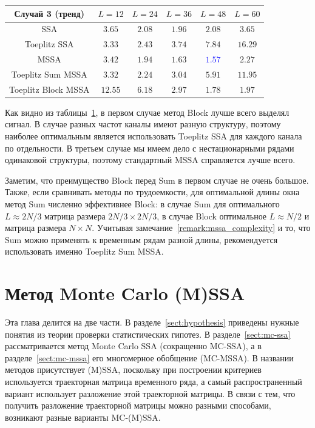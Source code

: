 \documentclass[specialist,
substylefile = spbu.rtx,
               subf,href,colorlinks=true,12pt]{disser}
\theoremstyle{definition}
\begin{document}
\begin{table}[h]
\begin{tabular}{cccccc}
			\hhline{======}
			Случай 3 (тренд)                 & $L=12$  & $L=24$                     & $L=36$                     & $L=48$                     & $L=60$          \\
			\hline
			SSA                              & $3.65$  & $2.08$                     & $\mathbf{1.96}$            & $2.08$                     & $3.65$          \\
			\hline
			Toeplitz SSA                     & $3.33$  & $\mathbf{2.43}$            & $3.74$                     & $7.84$                     & $16.29$         \\
			\hline
			MSSA                             & $3.42$  & $1.94$                     & $1.63$                     & \textcolor{blue}{${\mathbf{1.57}}$} & $2.27$          \\
			\hline
			Toeplitz Sum MSSA                & $3.32$  & $\mathbf{2.24}$            & $3.04$                     & $5.91$                     & $11.95$         \\
			\hline
			Toeplitz Block MSSA              & $12.55$ & $6.18$                     & $2.97$                     & $\mathbf{1.78}$            & $1.97$          \\
			\hline
		\end{tabular}
	\label{tab:mse}
\end{table}

Как видно из таблицы~\ref{tab:mse}, в первом случае метод Block лучше всего выделял сигнал. В случае разных частот каналы имеют разную структуру, поэтому наиболее оптимальным является использовать Toeplitz SSA для каждого канала по отдельности.  В третьем случае мы имеем дело с нестационарными рядами одинаковой структуры, поэтому стандартный MSSA справляется лучше всего.

Заметим, что преимущество Block перед Sum в первом случае не очень большое. Также, если сравнивать методы по трудоемкости, для оптимальной длины окна метод Sum численно эффективнее Block: в случае Sum для оптимального $L\approx 2N/3$ матрица размера $2N/3\times2N/3$, в случае Block оптимальное $L\approx N/2$ и матрица размера $N\times N$. Учитывая замечание~\ref{remark:mssa_complexity} и то, что Sum можно применять к временным рядам разной длины, рекомендуется использовать именно Toeplitz Sum MSSA.

\chapter{Метод Monte Carlo (M)SSA}\label{chpt:mc-ssa}
Эта глава делится на две части. В разделе~\ref{sect:hypothesis} приведены нужные понятия из теории проверки статистических гипотез. В разделе~\ref{sect:mc-ssa} рассматривается метод Monte Carlo SSA (сокращенно MC-SSA), а в разделе~\ref{sect:mc-mssa} его многомерное обобщение (MC-MSSA). В названии методов присутствует (M)SSA, поскольку при построении критериев используется траекторная матрица временного ряда, а самый распространенный вариант использует разложение этой траекторной матрицы. В связи с тем, что получить разложение траекторной матрицы можно разными способами, возникают разные варианты MC-(M)SSA.
\end{document}

